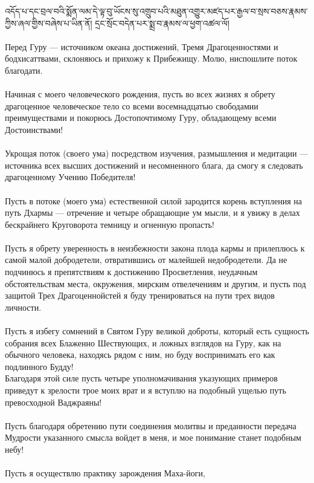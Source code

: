 འདོད་པ་དང་བྲལ་བའི་སྨོན་ལམ་དེ་ལྟ་བུ་ཡོངས་སུ་འགྲུབ་པའི་མཐུན་འགྱུར་མཛད་པར་རྒྱལ་བ་སྲས་བཅས་རྣམས་ཀྱིས་ཞལ་གྱིས་བཞེས་པ་ཡིན་ནོ།
དྲང་སྲོང་བདེན་པར་སྨྲ་བ་རྣམས་ལ་ཕྱག་འཚལ་ལོ།\\
\\
\ru
Перед Гуру — источником океана достижений,
Тремя Драгоце\-нностями и бодхисаттвами,
склоняюсь и прихожу к Прибежищу.
Молю, ниспошлите поток благодати.\\
\\
Начиная с моего человеческого рождения,
пусть во всех жизнях я обрету драгоценное человеческое тело
со всеми восемнадцатью свободамии преимуществами
и покорюсь Дос\-топочтимому Гуру,
обладающему всеми Достоинствами!\\
\\
Укрощая поток (своего ума) посредством изучения,
размышле\-ния и медитации — источника всех
высших достижений и несомненного блага,
да смогу я следовать драгоценному Учению Победителя!\\
\\
Пусть в потоке (моего ума) естественной силой
зародится корень вступления на путь Дхармы —
отречение и четыре обращающие ум мысли,
и я увижу в делах бескрайнего Круго\-ворота
темницу и огненную пропасть!\\
\\
Пусть я обрету уверенность в неизбежности закона плода кармы
и прилеплюсь к самой малой добродетели,
отвратившись от малейшей недобродетели.
Да не подчинюсь я препятствиям к достижению Просветления,
неудачным обстоятельствам места, окружения,
мирским отвелечениям и другим, и пусть под защитой
Трех Драгоценнойстей я буду тренироваться на пути трех видов личности.\\
\\
Пусть я избегу сомнений в Святом Гуру великой доброты,
который есть сущность собрания всех Блаженно Шествующих,
и ложных взглядов на Гуру, как на обычного человека,
находясь рядом с ним, но буду воспринимать его как подлинного Будду!
\\
Благодаря этой силе пусть четыре уполномачивания
указующих примеров приведут к зрелости трое моих врат
и я вступлю на подобный ущелью путь превосходной Ваджраяны!\\
\\
Пусть благодаря обретению пути соединения молитвы и преда\-нности
передача Мудрости указанного смысла войдет в меня,
и мое понимание станет подобным небу!\\
\\
Пусть я осуществлю практику зарождения Маха-йоги,
